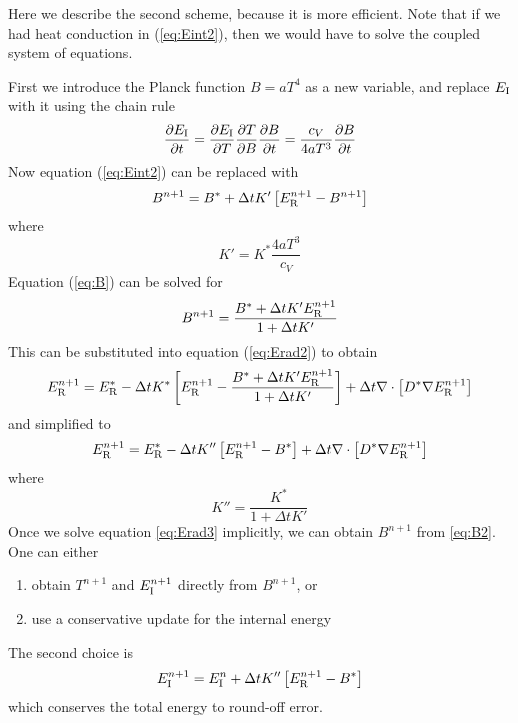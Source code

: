 \documentclass[12pt]{article}
\newcommand{\Eint}{E_{\rm I}}
\newcommand{\Erad}{E_{\rm R}}
\begin{document}
Here we describe the second scheme, because it is more efficient. 
Note that if we had heat conduction in (\ref{eq:Eint2}), 
then we would have to solve the coupled system of equations.

First we introduce the Planck function $B = a T^4$ as a new variable,
and replace $\Eint$ with it using the chain rule
\begin{equation}
\frac{\partial \Eint}{\partial t} = 
   \frac{\partial \Eint}{\partial T}
   \frac{\partial T}{\partial B}
   \frac{\partial B}{\partial t}
   = \frac{c_V}{4 a T^3}\frac{\partial B}{\partial t}
\end{equation}
Now equation (\ref{eq:Eint2}) can be replaced with
\begin{equation}
B^{n+1} = B^* + \Delta t K'\left[\Erad^{n+1} - B^{n+1}\right]  
   \label{eq:B}
\end{equation}
where
\begin{equation}
K' = K^* \frac{4 a T^3}{c_V}
\end{equation}
Equation (\ref{eq:B}) can be solved for
\begin{equation}
  B^{n+1} = \frac{B^* + \Delta t K' \Erad^{n+1}}{1 + \Delta t K'}
   \label{eq:B2}
\end{equation}
This can be substituted into equation (\ref{eq:Erad2}) to obtain
\begin{equation}
\Erad^{n+1} = \Erad^* - \Delta t K^*\left[\Erad^{n+1} 
              - \frac{B^* + \Delta t K' \Erad^{n+1}}{1 + \Delta t K'}\right]
                + \Delta t \nabla\cdot\left[ D^* \nabla \Erad^{n+1} \right]
\end{equation}
and simplified to
\begin{equation}
\Erad^{n+1} = \Erad^* - \Delta t K''\left[\Erad^{n+1} - B^*\right]
                + \Delta t \nabla\cdot\left[ D^* \nabla \Erad^{n+1} \right]
\label{eq:Erad3}
\end{equation}
where
\begin{equation}
K'' = \frac{K^*}{1 + \Delta t K'} 
\end{equation}
Once we solve equation \ref{eq:Erad3} implicitly, we can obtain $B^{n+1}$
from \ref{eq:B2}. One can either
\begin{enumerate}
\item obtain $T^{n+1}$ and $\Eint^{n+1}$ directly from $B^{n+1}$, or
\item use a conservative update for the internal energy
\end{enumerate}
The second choice is
\begin{equation}
\Eint^{n+1} = \Eint^n + \Delta t K''\left[\Erad^{n+1} - B^*\right]
\end{equation}
which conserves the total energy to round-off error.
\end{document}
